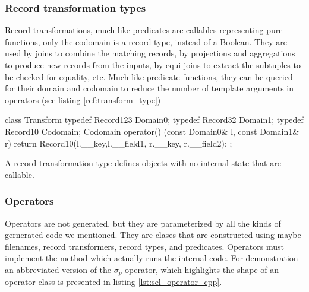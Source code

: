 \subsubsection{Record transformation types}

Record transformations, much like predicates are callables
representing pure functions, only the codomain is a record type,
instead of a Boolean. They are used by joins to combine the matching
records, by projections and aggregations to produce new records from
the inputs, by equi-joins to extract the subtuples to be checked for
equality, etc. Much like predicate functions, they can be queried for
their domain and codomain to reduce the number of template arguments
in operators (see listing \ref{ref:transform_type})

\begin{code}
\begin{cppcode}
class Transform {
  typedef Record123 Domain0;
  typedef Record32 Domain1;
  typedef Record10 Codomain;
  Codomain operator() (const Domain0& l, const Domain1& r) {
    return Record10(l.__key,l.__field1, r.__key, r.__field2);
  }
};
\end{cppcode}
  \caption{\label{ref:transform_type}A record transformation type
    defines objects with no internal state that are callable.}
\end{code}


\subsubsection{Operators}

Operators are not generated, but they are parameterized by all the
kinds of gernerated code we mentioned. They are clases that are
constructed using maybe-filenames, record transformers, record types,
and predicates. Operators must implement the  method which actually
runs the internal code. For demonstration an abbreviated
version of the \(\sigma_p\) operator, which highlights the shape of an
operator class is presented in listing \ref{lst:sel_operator_cpp}.

